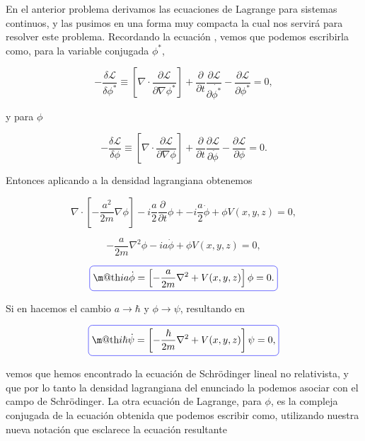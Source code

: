 \documentclass[a4paper,10pt]{article}
\makeatletter
\numberwithin{equation}{section}
\newcommand*{\boxcolor}{blue}
\renewcommand{\boxed}[1]{\textcolor{\boxcolor}{%
\tikz[baseline={([yshift=-1ex]current bounding box.center)}] \node [rectangle, minimum width=1ex,rounded corners,draw] {\normalcolor\m@th$\displaystyle#1$};}}
\makeatother
\begin{document}
En el anterior problema derivamos las ecuaciones de Lagrange para sistemas continuos, 
y las pusimos en una forma muy compacta la cual nos servirá para resolver este problema. 
Recordando la ecuación , vemos que podemos escribirla como, para 
la variable conjugada $\phi^*$,

\begin{equation}
 - \frac{\delta \mathcal{L}}{\delta \phi^*} \equiv 
 \left[ \nabla \cdot \frac{\partial \mathcal{L}}{\partial \nabla \phi^*} \right] 
 + \frac{\partial}{\partial t}\frac{\partial \mathcal{L}}{\partial \dot{\phi^*}} 
 - \frac{\partial \mathcal{L}}{\partial \phi^*} = 0,
 \label{eq:shro1}
\end{equation}

y para $\phi$ 

\begin{equation}
 - \frac{\delta\mathcal{L}}{\delta \phi} \equiv 
 \left[ \nabla \cdot \frac{\partial \mathcal{L}}{\partial \nabla \phi} \right] 
 + \frac{\partial}{\partial t}\frac{\partial \mathcal{L}}{\partial \dot{\phi}} 
 - \frac{\partial \mathcal{L}}{\partial \phi} = 0.
 \label{eq:shro2}
\end{equation}

Entonces aplicando  a la densidad lagrangiana obtenemos 

\begin{equation}
 \nabla \cdot \left[ - \frac{a^2}{2m}\nabla\phi \right] - 
 i\frac{a}{2}\frac{\partial}{\partial t} \phi + - i\frac{a}{2}\dot{\phi} + 
 \phi V(x,y,z) = 0,
\end{equation}

\begin{equation}
 -\frac{a}{2m}\nabla^2 \phi - ia\dot{\phi} + \phi V(x,y,z) = 0,
\end{equation}

\begin{equation}
 \boxed{ia\dot{\phi} = \left[-\frac{a}{2m}\nabla^2 + V(x,y,z)\right]\phi = 0.}
 \label{eq:shro3}
\end{equation}

Si en  hacemos el cambio $a \rightarrow \hbar$ y $\phi \rightarrow \psi$, 
resultando en

\begin{equation}
 \boxed{i\hbar\dot{\psi} = \left[-\frac{\hbar}{2m}\nabla^2 + V(x,y,z)\right]\psi = 0,}
 \label{eq:shro4}
\end{equation}

vemos que hemos encontrado la ecuación de Schrödinger lineal no relativista, y que 
por lo tanto la densidad lagrangiana del enunciado la podemos asociar con el 
campo de Schrödinger. La otra ecuación de Lagrange, para $\phi$, es la compleja 
conjugada de la ecuación obtenida que podemos escribir como, utilizando nuestra 
nueva notación que esclarece la ecuación resultante
\end{document}
